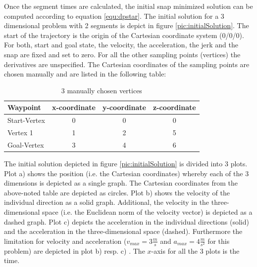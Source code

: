 Once the segment times are calculated, the initial snap minimized solution can be computed according to equation \ref{equ:dpstar}. The initial solution for a 3 dimensional problem with 2 segments is depict in figure \ref{pic:initialSolution}. The start of the trajectory is the origin of the Cartesian coordinate system (0/0/0). For both, start and goal state, the velocity, the acceleration, the jerk and the snap are fixed and set to zero. For all the other sampling points (vertices) the derivatives are unspecified. The Cartesian coordinates of the sampling points are chosen manually and are listed in the following table: 

\begin{table}[H] 
\begin{center}
    \begin{tabular}{ | l | c | c | c |}
    \hline
    Waypoint & x-coordinate & y-coordinate & z-coordinate\\ \hline
    Start-Vertex & 0 & 0 & 0 \\ \hline
    Vertex 1 & 1 & 2 & 5\\ \hline
    Goal-Vertex & 3 & 4 & 6\\
    \hline
    \end{tabular}
    \caption{3 manually chosen  vertices}
    \label{tab:vertices}
\end{center}
\end{table}


The initial solution depicted in figure \ref{pic:initialSolution} is divided into 3 plots. Plot a) shows the position (i.e. the Cartesian coordinates) whereby each of the 3 dimensions is depicted as a single graph. The Cartesian coordinates from the above-noted table are depicted as circles. 
Plot b) shows the velocity of the individual direction as a solid graph. Additional, the velocity in the three-dimensional space (i.e. the Euclidean norm of the velocity vector) is depicted as a dashed graph.
Plot c) depicts the acceleration in the individual directions (solid) and the acceleration in the three-dimensional space (dashed). Furthermore the limitation for velocity and acceleration ($v_{max} = 3 \frac{m}{s}$ and $a_{max} = 4 \frac{m}{s^2}$ for this problem) are depicted in plot b) resp. c) . The $x$-axis for all the 3 plots is the time. \newpage



